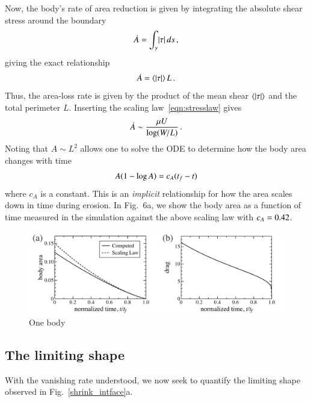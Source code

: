 \documentclass[preprint, 10pt]{elsarticle}
\begin{document}
Now, the body's rate of area reduction is given by integrating the
absolute shear stress around the boundary
\begin{align*}
  \dot{A} = \int_{\gamma} \lvert \tau \rvert \, ds \, ,
\end{align*}
giving the exact relationship
\begin{align*}
  \dot{A} = \left< \lvert \tau \rvert \right> L \, .
\end{align*}
Thus, the area-loss rate is given by the product of the mean shear
$\left< \lvert \tau \rvert \right>$ and the total perimeter $L$. Inserting the scaling
law~\eqref{eqn:stresslaw} gives
\begin{align*}
  \dot{A} \sim \frac{\mu U}{\log(W/L)} \, .
\end{align*}
Noting that $A \sim L^2$ allows one to solve the ODE to determine how the body area changes with time
\begin{align*}
  A (1 - \log A) = c_A (t_f - t)
\end{align*}
where $c_A$ is a constant.
This is an {\em implicit} relationship for how the area scales down in time during erosion.
In Fig.~6a, we show the body area as a function of time measured in the simulation
against the above scaling law with $c_A = 0.42$.


\begin{figure}%
\begin{center}
\includegraphics[width = 0.8 \textwidth]{./figs/area_drag.pdf}
\caption{One body}
\label{}
\end{center}
\end{figure}

\subsection{The limiting shape}

With the vanishing rate understood, we now seek to quantify the limiting
shape observed in Fig.~\ref{shrink_intface}a.
\end{document}
